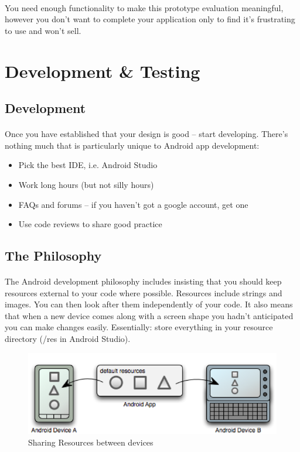 \paragraph{} You need enough functionality to make this prototype evaluation meaningful, however you don't want to complete your application only to find it's frustrating to use and won't sell.

\section{Development \& Testing}

\subsection{Development}
\paragraph{} Once you have established that your design is good – start developing. There’s nothing much that is particularly unique to Android app development:

\begin{itemize}
\item Pick the best IDE, i.e. Android Studio
\item Work long hours (but not silly hours)
\item FAQs and forums – if you haven’t got a google account, get one
\item Use code reviews to share good practice
\end{itemize}

\subsection{The Philosophy}

\paragraph{} The Android development philosophy includes insisting that you should keep resources external to your code where possible. Resources include strings and images. You can then look after them independently of your code. It also means that when a new device comes along with a screen shape you hadn’t anticipated you can make changes easily. Essentially: store everything in your resource directory (/res in Android Studio).


\begin{figure}[H]%
\centering
\includegraphics[width=\textwidth]{images/res_sharing}
\caption{Sharing Resources between devices}
\label{fig:res_sharing}
\end{figure}


